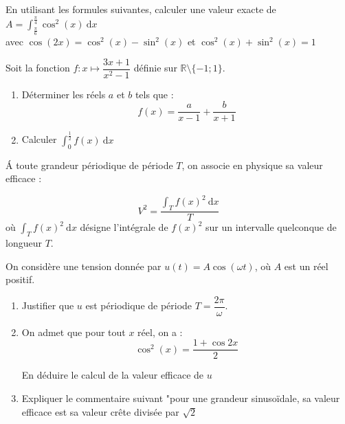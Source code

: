 \documentclass[11pt,a4paper]{article}
\newcommand{\cadre}[1]
{\begin{bclogo}[couleur = white,logo=,  arrondi = 0.3,barre=none]
		{%
			\rule{0mm}{#1mm}}\par
		\medskip
\end{bclogo}}
\begin{document}
	
	En utilisant les formules suivantes, calculer une valeur exacte de $A=\displaystyle \int_{\frac{\pi}{6}}^{\frac{\pi}{4}} \cos^2(x) ~\mathrm{d}x$ \\avec $\cos(2x)= \cos^2(x) - \sin^2(x) $ et $\cos^2(x) + \sin^2(x) = 1$
	
	\cadre{20}
	
	
	Soit la fonction $f : x \mapsto \dfrac{3x+1}{x^2-1}$ définie sur $\mathbb{R}\setminus\lbrace{-1;1}\rbrace$.\\
	\begin{enumerate}
		\item Déterminer les réels $a$ et $b$ tels que : \\
		$$ f(x)=\dfrac{a}{x-1} + \dfrac{b}{x+1}$$
		\cadre{30}
		\newpage 
		
		
		\item Calculer $\displaystyle \int_{0}^{\frac{1}{2}}f(x) ~\mathrm{d}x$

		\cadre{20}
		
	\end{enumerate}
	
	
	\'A toute grandeur périodique de période $T$, on associe en physique sa valeur efficace : 
	
	$$V^2 = \dfrac{\displaystyle \int_{T}^{ }f(x)^2 ~\mathrm{d}x}{T}$$ où $\displaystyle \int_{T}^{ }f(x)^2 ~\mathrm{d}x$ désigne l'intégrale de $f(x)^2$ sur un intervalle quelconque de longueur $T$.
	
	On considère une tension donnée par $u(t)=A\cos(\omega t)$, où $A$ est un réel positif. 
	
	\begin{enumerate}
		\item Justifier que $u$ est périodique de période $T=\dfrac{2\pi}{\omega}$. 
		
		\cadre{20}
		
		\item  On admet que pour tout $x$ réel, on a : 
		$$\cos^2(x)=\dfrac{1+\cos2x}{2}$$
		
		En déduire le calcul de la valeur efficace de $u$
		
		\cadre{50}
		
		\item Expliquer le commentaire suivant "pour une grandeur sinusoïdale, sa valeur efficace est sa valeur crête divisée par $\sqrt{2}$
		
		\cadre{20}
	\end{enumerate}
	
	
	
\end{document}
